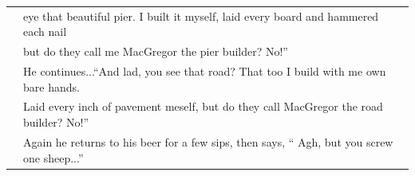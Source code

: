 \documentclass{article} %
\begin{document}
\begin{table} [h]
\begin{tabular}{c | l}
     & eye that beautiful pier. I built it myself, laid every board
       and hammered each nail \\
     & but do they call me MacGregor the pier builder? No!'' \\
     & He continues...``And lad, you see that road? That too I build with me
       own bare hands. \\
     & Laid every inch of pavement meself, but do they
       call MacGregor the road builder? No!''\\
     & Again he returns to his beer for a few sips, then says,
       `` Agh, but you screw  one sheep...''\\
\hline \hline
\end{tabular}
\label{joketexts}
\end{table}
\end{document}
